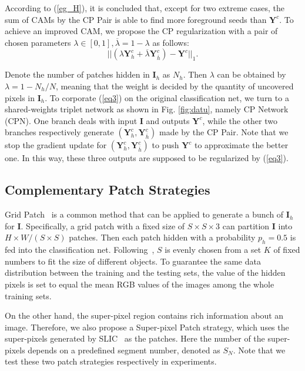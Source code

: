 \documentclass[10pt,twocolumn,letterpaper]{article}
\begin{document}
According to (\ref{eg_H}), it is concluded that, except for two extreme cases, the sum of CAMs by the CP Pair is able to find more foreground seeds than $\boldsymbol{Y}^{c}$. To achieve an improved CAM, we propose the CP regularization with a pair of chosen parameters ${\lambda} \in [0,1], {\overline \lambda} = 1- {\lambda}$ as follows:
\begin{equation}\label{eq3}
||({\lambda}\boldsymbol{Y}_{h}^{c}+ {\overline \lambda}\boldsymbol{Y}^{c}_{\overline h}) - \boldsymbol{Y}^{c}||_1.
\end{equation}

Denote the number of patches hidden in $\boldsymbol{I}_{h}$ as $N_h$. Then ${\lambda}$ can be obtained by ${\lambda} = 1 - N_h / N$, meaning that the weight is decided by the quantity of uncovered pixels in $\boldsymbol{I}_{h}$.
To corporate (\ref{eq3}) on the original classification net, we turn to a shared-weights triplet network as shown in Fig. \ref{fig:datu}, namely CP Network (CPN). One branch deals with input $\boldsymbol{I}$ and outputs $\boldsymbol{Y}^{c}$, while the other two branches respectively generate $(\boldsymbol{Y}^{c}_{h}, \boldsymbol{Y}^{c}_{\overline h})$ made by the CP Pair. Note that we stop the gradient update for $(\boldsymbol{Y}^{c}_{h}, \boldsymbol{Y}^{c}_{\overline h})$ to push $\boldsymbol{Y}^{c}$ to approximate the better one. In this way, these three outputs are supposed to be regularized by (\ref{eq3}).
\subsection{Complementary Patch Strategies} \label{sec_strategy}
Grid Patch~\cite{has, REDA} is a common method that can be applied to generate a bunch of $\boldsymbol{I}_h$ for $\boldsymbol{I}$. Specifically, a grid patch with a fixed size of $S \times S \times 3$ can partition $\boldsymbol{I}$ into $H \times W /(S \times S)$ patches. Then each patch hidden with a probability $p_h = 0.5$ is fed into the classification net. Following~\cite{has}, $S$ is evenly chosen from a set $K$ of fixed numbers to fit the size of different objects. To guarantee the same data distribution between the training and the testing sets, the value of the hidden pixels is set to equal the mean RGB values of the images among the whole training sets.

On the other hand, the super-pixel region contains rich information about an image. Therefore, we also propose a Super-pixel Patch strategy, which uses the super-pixels generated by SLIC~\cite{slic} as the patches. Here the number of the super-pixels depends on a predefined segment number, denoted as $S_N$. Note that we test these two patch strategies respectively in experiments.
\end{document}
